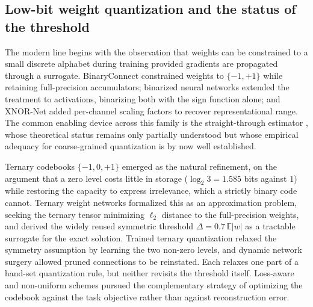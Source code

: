 \documentclass[final,5p,times,twocolumn]{elsarticle}
\theoremstyle{remark}
\newcommand{\E}{\mathbb{E}}
\begin{document}
\subsection{Low-bit weight quantization and the status of the threshold}
\label{sec:rel-quant}

The modern line begins with the observation that weights can be constrained to
a small discrete alphabet during training provided gradients are propagated
through a surrogate. BinaryConnect \cite{courbariaux2015} constrained weights
to $\{-1,+1\}$ while retaining full-precision accumulators; binarized neural
networks \cite{hubara2016} extended the treatment to activations, binarizing
both with the sign function alone; and XNOR-Net \cite{rastegari2016} added
per-channel scaling factors to recover representational range. The common enabling device across this family
is the straight-through estimator \cite{bengio2013}, whose theoretical status
remains only partially understood but whose empirical adequacy for
coarse-grained quantization is by now well established.

Ternary codebooks $\{-1,0,+1\}$ emerged as the natural refinement, on the
argument that a zero level costs little in storage ($\log_{2}3 = 1.585$ bits
against $1$) while restoring the capacity to express irrelevance, which a
strictly binary code cannot. Ternary weight networks \cite{li2016} formalized
this as an approximation problem, seeking the ternary tensor minimizing
$\ell_{2}$ distance to the full-precision weights, and derived the widely
reused symmetric threshold $\Delta = 0.7\,\E|w|$ as a tractable surrogate for
the exact solution. Trained ternary quantization \cite{zhu2017a} relaxed the
symmetry assumption by learning the two non-zero levels, and dynamic network
surgery \cite{guo2016} allowed pruned connections to be reinstated. Each
relaxes one part of a hand-set quantization rule, but neither revisits the
threshold itself. Loss-aware and non-uniform schemes
\cite{hou2017,zhang2018} pursued the complementary strategy of optimizing the
codebook against the task objective rather than against reconstruction error.
\end{document}
